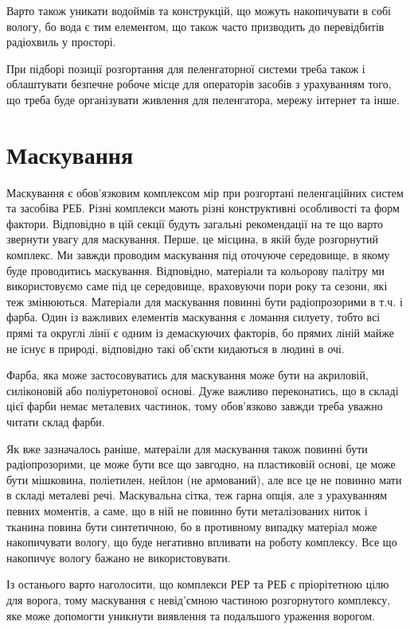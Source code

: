 \documentclass{article}
\begin{document}
Варто також уникати водоймів та конструкцій, що можуть накопичувати в собі вологу, бо вода є тим елементом, що також часто призводить до перевідбитів радіохвиль у просторі.

При підборі позиції розгортання для пеленгаторної системи треба також і облаштувати безпечне робоче місце для операторів засобів з урахуванням того, що треба буде організувати живлення для пеленгатора, мережу інтернет та інше. 


\section{Маскування}

Маскування є обов'язковим комплексом мір при розгортані пеленгаційних систем та засобіва РЕБ. Різні комплекси мають різні конструктивні особливості та форм фактори. Відповідно в цій секції будуть загальні рекомендації на те що варто звернути увагу для маскування. Перше, це місцина, в якій буде розгорнутий комплекс. Ми завжди проводим маскування під оточуюче середовище, в якому буде проводитись маскування. Відповідно, матеріали та кольорову палітру ми використовуємо саме під це середовище, враховуючи пори року та сезони, які теж змінюються. Матеріали для маскування повинні бути радіопрозорими в т.ч. і фарба. Один із важливих елементів маскування є ломання силуету, тобто всі прямі та округлі лінії є одним із демаскуючих факторів, бо прямих ліній майже не існує в природі, відповідно такі об'єкти кидаються в людині в очі.

Фарба, яка може застосовуватись для маскування може бути на акриловій, силіконовій або поліуретонової основі. Дуже важливо переконатись, що в складі цієї фарби немає металевих частинок, тому обов'язково завжди треба уважно читати склад фарби.

Як вже зазначалось раніше, матераіли для маскування також повинні бути радіопрозорими, це може бути все що завгодно, на пластиковій основі, це може бути мішковина, поліетилен, нейлон (не армований), але все це не повинно мати в складі металеві речі. Маскувальна сітка, теж гарна опція, але з урахуванням певних моментів, а саме, що в ній не повинно бути металізованих ниток і тканина повина бути синтетичною, бо в противному випадку матеріал може накопичувати вологу, що буде негативно впливати на роботу комплексу. Все що накопичує вологу бажано не використовувати.

Із останього варто наголосити, що комплекси РЕР та РЕБ є пріорітетною цілю для ворога, тому маскування є невід'ємною частиною розгорнутого комплексу, яке може допомогти уникнути виявлення та подальшого ураження ворогом.
\end{document}
